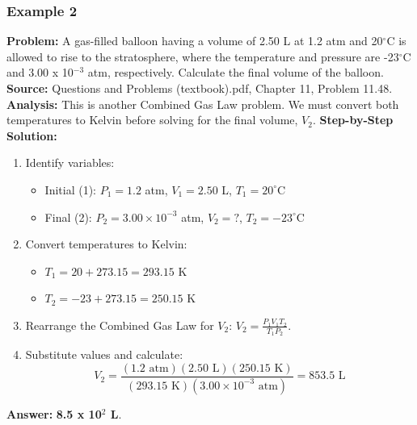 \documentclass{article}
\begin{document}
\subsubsection{Example 2}
\textbf{Problem:} A gas-filled balloon having a volume of 2.50 L at 1.2 atm and 20$^\circ$C is allowed to rise to the stratosphere, where the temperature and pressure are -23$^\circ$C and 3.00 x 10$^{-3}$ atm, respectively. Calculate the final volume of the balloon.
\textbf{Source:} Questions and Problems (textbook).pdf, Chapter 11, Problem 11.48.
\textbf{Analysis:} This is another Combined Gas Law problem. We must convert both temperatures to Kelvin before solving for the final volume, $V_2$.
\textbf{Step-by-Step Solution:}
\begin{enumerate}
    \item Identify variables:
    \begin{itemize}
        \item Initial (1): $P_1 = 1.2$ atm, $V_1 = 2.50$ L, $T_1 = 20^\circ$C
        \item Final (2): $P_2 = 3.00 \times 10^{-3}$ atm, $V_2 = ?$, $T_2 = -23^\circ$C
    \end{itemize}
    \item Convert temperatures to Kelvin:
    \begin{itemize}
        \item $T_1 = 20 + 273.15 = 293.15$ K
        \item $T_2 = -23 + 273.15 = 250.15$ K
    \end{itemize}
    \item Rearrange the Combined Gas Law for $V_2$: $V_2 = \frac{P_1 V_1 T_2}{T_1 P_2}$.
    \item Substitute values and calculate:
    \[ V_2 = \frac{(1.2 \text{ atm})(2.50 \text{ L})(250.15 \text{ K})}{(293.15 \text{ K})(3.00 \times 10^{-3} \text{ atm})} = 853.5 \text{ L} \]
\end{enumerate}
\textbf{Answer:} \textbf{8.5 x 10$^2$ L}.
\end{document}
